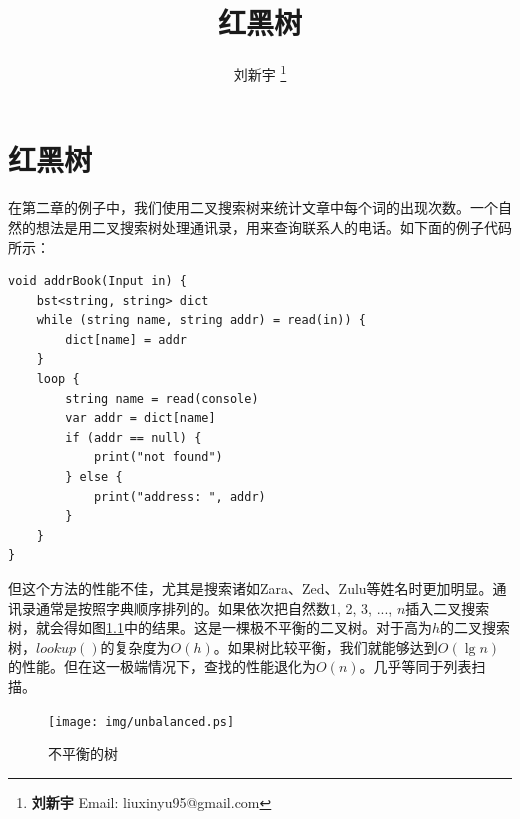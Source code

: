 \documentclass[b5paper]{ctexart}
\begin{document}
\title{红黑树}

\author{刘新宇
\thanks{{\bfseries 刘新宇} \newline
  Email: liuxinyu95@gmail.com \newline}
  }

\maketitle
\fi


\ifx\wholebook\relax
\chapter{红黑树}
\fi

在第二章的例子中，我们使用二叉搜索树来统计文章中每个词的出现次数。一个自然的想法是用二叉搜索树处理通讯录，用来查询联系人的电话。如下面的例子代码所示：

\lstset{frame = single}
\begin{lstlisting}[language=Bourbaki]
void addrBook(Input in) {
    bst<string, string> dict
    while (string name, string addr) = read(in)) {
        dict[name] = addr
    }
    loop {
        string name = read(console)
        var addr = dict[name]
        if (addr == null) {
            print("not found")
        } else {
            print("address: ", addr)
        }
    }
}
\end{lstlisting}

但这个方法的性能不佳，尤其是搜索诸如Zara、Zed、Zulu等姓名时更加明显。通讯录通常是按照字典顺序排列的。如果依次把自然数1, 2, 3, ..., $n$插入二叉搜索树，就会得如图\ref{fig:unbalanced-tree}中的结果。这是一棵极不平衡的二叉树。对于高为$h$的二叉搜索树，$lookup()$的复杂度为$O(h)$。如果树比较平衡，我们就能够达到$O(\lg n)$的性能。但在这一极端情况下，查找的性能退化为$O(n)$。几乎等同于列表扫描。


\begin{figure}[htbp]
    \centering
	\texttt{[image: img/unbalanced.ps]}
    \caption{不平衡的树} \label{fig:unbalanced-tree}
\end{figure}


\begin{Exercise}
\end{Exercise}
\end{document}
